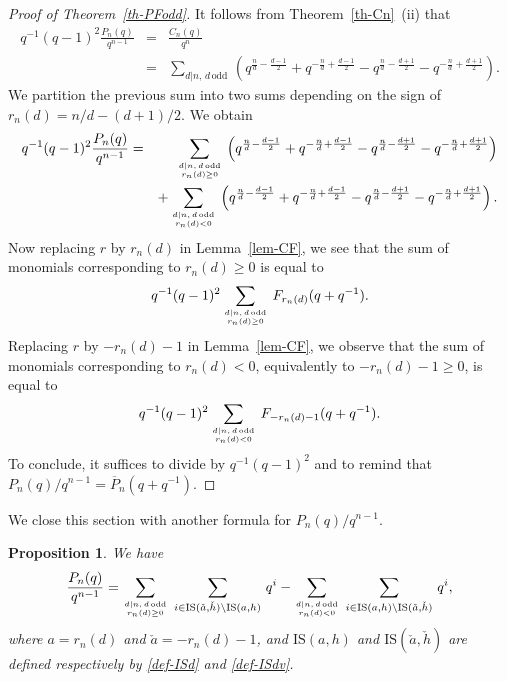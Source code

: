 \documentclass[11pt, a4paper]{amsart}
\newtheorem{prop}[theorem]{Proposition}
\theoremstyle{definition}
\newcommand\Pg{\overline{P}}
\newcommand\IS{\mathrm{IS}}
\numberwithin{equation}{section}
\begin{document}
\begin{proof}[Proof of Theorem~\ref{th-PFodd}]
It follows from Theorem~\ref{th-Cn}~(ii) that
\begin{eqnarray*}
q^{-1}(q-1)^2 \frac{P_n(q)}{q^{n-1}}  
& = & \frac{C_n(q)}{q^n} \\
& = & \sum_{d | n , \, d\, \mathrm{odd}} \, 
\left( q^{\frac{n}{d} - \frac{d-1}{2}} +  q^{-\frac{n}{d} + \frac{d-1}{2}}  
- q^{\frac{n}{d} - \frac{d+1}{2}}  - q^{-\frac{n}{d} + \frac{d+1}{2}} \right) .
\end{eqnarray*}
We partition the previous sum into two sums depending on the sign of $r_n(d) = n/d - (d+1)/2$.
We obtain 
\begin{eqnarray*}
q^{-1}(q-1)^2 \frac{P_n(q)}{q^{n-1}}  
& = & \sum_{d | n, \, d \, \mathrm{odd} \atop r_n(d) \geq 0} \,
\left( q^{\frac{n}{d} - \frac{d-1}{2}} +  q^{-\frac{n}{d} + \frac{d-1}{2}}  
- q^{\frac{n}{d} - \frac{d+1}{2}}  - q^{-\frac{n}{d} + \frac{d+1}{2}} \right) \\
& & + \sum_{d | n, \, d \, \mathrm{odd} \atop r_n(d) < 0} \,
\left( q^{\frac{n}{d} - \frac{d-1}{2}} +  q^{-\frac{n}{d} + \frac{d-1}{2}}  
- q^{\frac{n}{d} - \frac{d+1}{2}}  - q^{-\frac{n}{d} + \frac{d+1}{2}} \right) .
\end{eqnarray*} 
Now replacing $r$ by $r_n(d)$ in Lemma~\ref{lem-CF}, we see that the sum of monomials corresponding to $r_n(d) \geq 0$
is equal to 
\[
q^{-1}(q-1)^2 \sum_{d | n, \, d \, \mathrm{odd} \atop r_n(d) \geq 0} \, F_{r_n(d)}(q + q^{-1}).
\]
Replacing $r$ by $-r_n(d) - 1$ in Lemma~\ref{lem-CF}, we observe that the sum of monomials corresponding to $r_n(d) < 0$, 
equivalently to $-r_n(d) - 1 \geq 0$, is equal to
\[
q^{-1}(q-1)^2 \sum_{d | n, \, d \, \mathrm{odd} \atop r_n(d) < 0} \, F_{-r_n(d) -1}(q + q^{-1}).
\]
To conclude, it suffices to divide by $q^{-1}(q-1)^2$ 
and to remind that $P_n(q)/q^{n-1} = \Pg_n(q + q^{-1})$.
\end{proof}

We close this section with another formula for $P_n(q)/q^{n-1}$.

\begin{prop}\label{formula2}
We have
\[
\frac{P_n(q)}{q^{n-1}} =
\sum_{d|n, \,d\,\mathrm{odd} \atop r_n(d) \geq 0} \; \sum_{i \in  \IS(\check{a},\check{h}) \setminus \IS(a,h)} \, q^i
- \sum_{d|n, \,d\,\mathrm{odd} \atop r_n(d) < 0}  \; \sum_{i \in  \IS(a,h)\setminus   \IS(\check{a},\check{h})}\, q^i  ,
\]
where $a = r_n(d)$ and $\check{a} = - r_n(d) - 1$, and
$\IS(a,h)$ and $\IS(\check{a},\check{h})$ are defined respectively by \eqref{def-ISd} and \eqref{def-ISdv}.
\end{prop}
\end{document}
